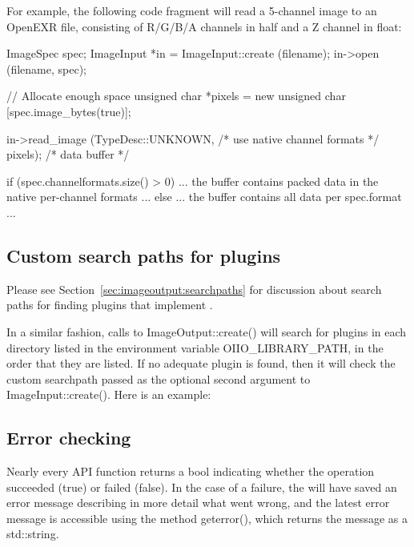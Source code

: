 For example, the following code fragment will read a 5-channel image
to an OpenEXR file, consisting of R/G/B/A channels in {\cf half} and
a Z channel in {\cf float}:

\begin{code}
        ImageSpec spec;
        ImageInput *in = ImageInput::create (filename);
        in->open (filename, spec);

        // Allocate enough space
        unsigned char *pixels = new unsigned char [spec.image_bytes(true)];

        in->read_image (TypeDesc::UNKNOWN, /* use native channel formats */
                        pixels);           /* data buffer */

        if (spec.channelformats.size() > 0) {
            ... the buffer contains packed data in the native 
                per-channel formats ...
        } else {
            ... the buffer contains all data per spec.format ...
        }
\end{code}


\subsection{Custom search paths for plugins}
\label{sec:imageinput:searchpaths}

Please see Section~\ref{sec:imageoutput:searchpaths} for discussion
about search paths for finding plugins that implement \ImageOutput.

In a similar fashion, calls to {\cf ImageOutput::create()}
will search for plugins in each directory listed in the environment
variable {\cf OIIO_LIBRARY_PATH}, in the order that they are listed.
If no adequate plugin is found, then it will check the custom searchpath
passed as the optional second argument to {\cf ImageInput::create()}.
Here is an example:



\subsection{Error checking}
\label{sec:imageinput:errors}

Nearly every \ImageInput API function returns a {\cf bool} indicating
whether the operation succeeded ({\cf true}) or failed ({\cf false}).
In the case of a failure, the \ImageInput will have saved an error
message describing in more detail what went wrong, and the latest
error message is accessible using the \ImageInput method 
{\cf geterror()}, which returns the message as a {\cf std::string}.

